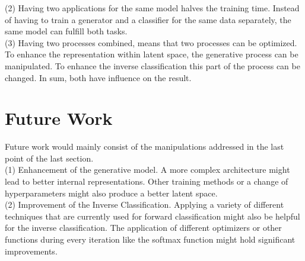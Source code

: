 (2) Having two applications for the same model halves the training time. Instead of having to train a generator and a classifier for the same data separately, the same model can fulfill both tasks. \\

(3) Having two processes combined, means that two processes can be optimized. To enhance the representation within latent space, the generative process can be manipulated. To enhance the inverse classification this part of the process can be changed. In sum, both have influence on the result. 

\section{Future Work}

Future work would mainly consist of the manipulations addressed in the last point of the last section. \\
(1) Enhancement of the generative model. A more complex architecture might lead to better internal representations. Other training methods or a change of hyperparameters might also produce a better latent space. \\

(2) Improvement of the Inverse Classification. Applying a variety of different techniques that are currently used for forward classification might also be helpful for the inverse classification. The application of different optimizers or other functions during every iteration like the softmax function might hold significant improvements.